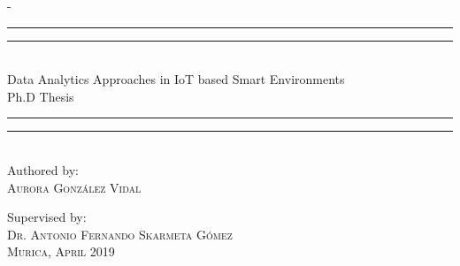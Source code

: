 \begin{titlingpage}
\begin{adjustwidth*}{\unitlength}{-\unitlength}
\begin{center}
\rule[0.5ex]{\linewidth}{2pt}\vspace*{-\baselineskip}\vspace*{3.2pt}
\rule[0.5ex]{\linewidth}{1pt}\\[\baselineskip]
{\HUGE Data Analytics Approaches in IoT based Smart Environments}\\[4mm]

{\Large Ph.D Thesis}\\
\rule[0.5ex]{\linewidth}{1pt}\vspace*{-\baselineskip}\vspace{3.2pt}
\rule[0.5ex]{\linewidth}{2pt}\\
\vspace{8mm}
{\large Authored by:}\\
\vspace{2.5mm}
{\large\textsc{Aurora Gonz\'alez Vidal}}\\
\vspace{6mm}

{\large Supervised by:}\\
\vspace{2.5mm}
{\large\textsc{Dr. Antonio Fernando Skarmeta G\'omez}}\\

\vspace{9mm}
{\large\textsc{Murica, April 2019}}
\vspace{12mm}
\end{center}
\end{adjustwidth*}
\end{titlingpage}